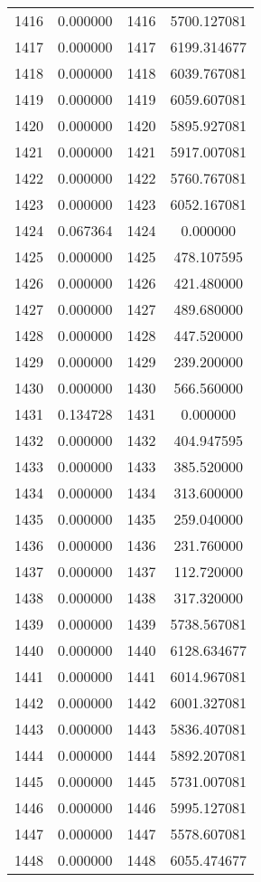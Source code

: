 \documentclass[12pt]{article}
\begin{document}
\begin{longtable}{@{}cccc@{}}
1416 & 0.000000 & 1416 & 5700.127081 \\
1417 & 0.000000 & 1417 & 6199.314677 \\
1418 & 0.000000 & 1418 & 6039.767081 \\
1419 & 0.000000 & 1419 & 6059.607081 \\
1420 & 0.000000 & 1420 & 5895.927081 \\
1421 & 0.000000 & 1421 & 5917.007081 \\
1422 & 0.000000 & 1422 & 5760.767081 \\
1423 & 0.000000 & 1423 & 6052.167081 \\
1424 & 0.067364 & 1424 & 0.000000 \\
1425 & 0.000000 & 1425 & 478.107595 \\
1426 & 0.000000 & 1426 & 421.480000 \\
1427 & 0.000000 & 1427 & 489.680000 \\
1428 & 0.000000 & 1428 & 447.520000 \\
1429 & 0.000000 & 1429 & 239.200000 \\
1430 & 0.000000 & 1430 & 566.560000 \\
1431 & 0.134728 & 1431 & 0.000000 \\
1432 & 0.000000 & 1432 & 404.947595 \\
1433 & 0.000000 & 1433 & 385.520000 \\
1434 & 0.000000 & 1434 & 313.600000 \\
1435 & 0.000000 & 1435 & 259.040000 \\
1436 & 0.000000 & 1436 & 231.760000 \\
1437 & 0.000000 & 1437 & 112.720000 \\
1438 & 0.000000 & 1438 & 317.320000 \\
1439 & 0.000000 & 1439 & 5738.567081 \\
1440 & 0.000000 & 1440 & 6128.634677 \\
1441 & 0.000000 & 1441 & 6014.967081 \\
1442 & 0.000000 & 1442 & 6001.327081 \\
1443 & 0.000000 & 1443 & 5836.407081 \\
1444 & 0.000000 & 1444 & 5892.207081 \\
1445 & 0.000000 & 1445 & 5731.007081 \\
1446 & 0.000000 & 1446 & 5995.127081 \\
1447 & 0.000000 & 1447 & 5578.607081 \\
1448 & 0.000000 & 1448 & 6055.474677 \\

\end{longtable}
\end{document}
